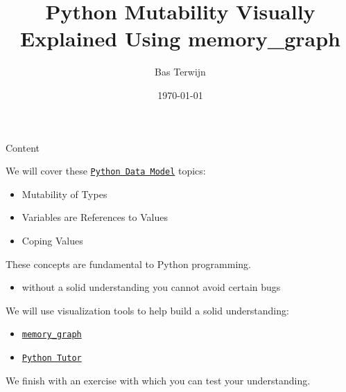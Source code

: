 \documentclass[10pt, colorlinks=true, urlcolor=blue]{beamer}
\title{Python Mutability Visually Explained Using memory\_graph}
\author{Bas Terwijn}
\date{\today}
\begin{document}
\begin{frame}
    \titlepage
\end{frame}

\begin{frame}{Content}

  We will cover these \href{https://docs.python.org/3/reference/datamodel.html}{\texttt{Python Data Model}} topics:
  \begin{itemize}
  \item Mutability of Types
  \item Variables are References to Values
  \item Coping Values
  \end{itemize}

  \vspace{2em}
  
  These concepts are fundamental to Python programming.
  \begin{itemize}
    \item without a solid understanding you cannot avoid certain bugs
  \end{itemize}

  \vspace{2em}
  
  We will use visualization tools to help build a solid understanding:
  \begin{itemize}
  \item \href{https://pypi.org/project/memory-graph/}{\texttt{memory\_graph}}
  \item \href{https://pythontutor.com/}{\texttt{Python Tutor}}
  \end{itemize}

  \vspace{2em}

  We finish with an exercise with which you can test your understanding.
\end{frame}
\end{document}
